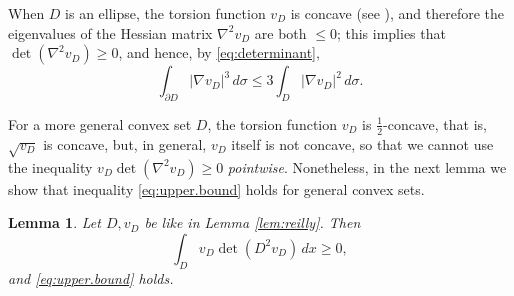 \documentclass[10pt,reqno,a4paper]{article}
\numberwithin{equation}{section}
\theoremstyle{plain}
\newtheorem{lemma}[theorem]{Lemma}
\theoremstyle{definition}
\newcommand{\pa}{\partial}
\begin{document}
When $D$ is an ellipse, %
the torsion function $v_D$ is concave (see \cite{HNST}), 
and therefore the eigenvalues of the Hessian matrix $\nabla^2 v_D$ are both $\leq 0$; 
this implies that $\det(\nabla^2 v_D) \geq 0$, and hence, by \eqref{eq:determinant}, 
\begin{equation}\label{eq:upper.bound}
\int_{\pa D}|\nabla v_D|^3\, d\sigma \leq 3\int_{D}|\nabla v_D|^2\, d\sigma.
\end{equation}

For a more general convex set $D$, the torsion function $v_D$ is $\frac12$-concave, 
that is, $\sqrt{ v_D }$ is concave, 
but, in general, $v_D$ itself is not concave, 
so that we cannot use the inequality $v_D \det(\nabla^2 v_D) \geq 0$ \emph{pointwise}. 
Nonetheless, in the next lemma we show that inequality \eqref{eq:upper.bound} holds for general convex sets.

\begin{lemma}\label{lem:inequality.for.gradient1}
Let $D, v_D$ be like in Lemma \ref{lem:reilly}. Then 
\begin{equation} \label{int.det.pos}
\int_D v_D \det(D^2 v_D) \, dx \geq 0,
\end{equation}
and \eqref{eq:upper.bound} holds. 
\end{lemma}
\end{document}
